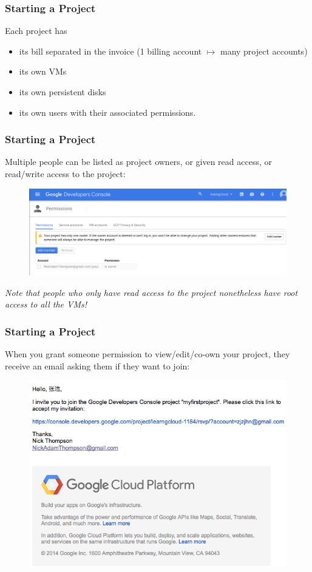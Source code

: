 \documentclass[9pt]{beamer}
\begin{document}
\begin{frame}[fragile]
  \frametitle{Starting a Project}
  Each project has
  \pause
  \begin{itemize}
  \item its bill separated in the invoice (1 billing account $\mapsto$ many project accounts)
    \pause
  \item its own VMs
    \pause
  \item its own persistent disks
    \pause
  \item its own users with their associated permissions.
  \end{itemize}
\end{frame}

\begin{frame}[fragile]
  \frametitle{Starting a Project}
  Multiple people can be listed as project owners, or given read access, or read/write access to the project:
  \begin{figure}
    \includegraphics[scale=0.2]{figures/AddProjectOwner.png}
  \end{figure}
  \emph{Note that people who only have read access to the project nonetheless have root access to all the VMs!}
\end{frame}

\begin{frame}[fragile]
  \frametitle{Starting a Project}
  When you grant someone permission to view/edit/co-own your project, they receive an email asking them if they want to join:
  \begin{figure}
    \includegraphics[scale=0.4]{figures/EmailConfirmation.png}
  \end{figure}
\end{frame}
\end{document}
